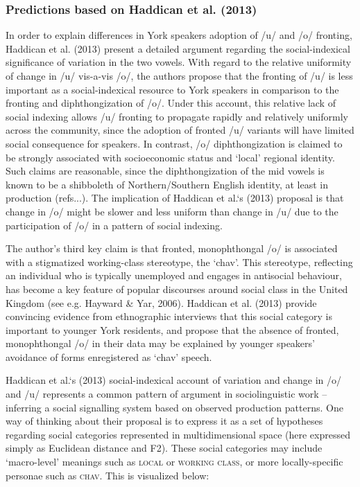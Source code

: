 \documentclass[PWPL]{article}
\begin{document}
\subsubsection{Predictions based on Haddican et al. (2013)}

In order to explain differences in York speakers adoption of /u/ and /o/ fronting, Haddican et al. (2013) present a detailed argument regarding the social-indexical significance of variation in the two vowels. With regard to the relative uniformity of change in /u/ vis-a-vis /o/, the authors propose that the fronting of /u/ is less important as a social-indexical resource to York speakers in comparison to the fronting and diphthongization of /o/. Under this account, this relative lack of social indexing allows /u/ fronting to propagate rapidly and relatively uniformly across the community, since the adoption of fronted /u/ variants will have limited social consequence for speakers. In contrast, /o/ diphthongization is claimed to be strongly associated with socioeconomic status and `local' regional identity. Such claims are reasonable, since the diphthongization of the mid vowels is known to be a shibboleth of Northern/Southern English identity, at least in production (refs...). The implication of Haddican et al.`s (2013) proposal is that change in /o/ might be slower and less uniform than change in /u/ due to the participation of /o/ in a pattern of social indexing. 

The author's third key claim is that fronted, monophthongal /o/ is associated with a stigmatized working-class stereotype, the `chav'. This stereotype, reflecting an individual who is typically unemployed and engages in antisocial behaviour, has become a key feature of popular discourses around social class in the United Kingdom (see e.g. Hayward \& Yar, 2006). Haddican et al. (2013) provide convincing evidence from ethnographic interviews that this social category is important to younger York residents, and propose that the absence of fronted, monophthongal /o/ in their data may be explained by younger speakers' avoidance of forms enregistered as `chav' speech. 

Haddican et al.`s (2013) social-indexical account of variation and change in /o/ and /u/ represents a common pattern of argument in sociolinguistic work -- inferring a social signalling system based on observed production patterns. One way of thinking about their proposal is to express it as a set of hypotheses regarding social categories represented in multidimensional space (here expressed simply as Euclidean distance and F2). These social categories may include `macro-level' meanings such as \textsc{local} or \textsc{working class}, or more locally-specific personae such as \textsc{chav}. This is visualized below:
\end{document}
